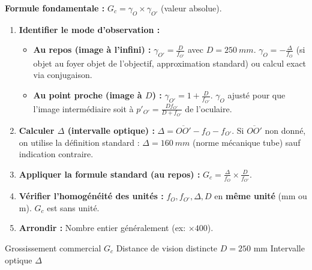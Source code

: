 \documentclass[11pt]{article}
\newcommand{\cle}[1]{{\popxbold\color{popdark}#1}}
\begin{document}
\begin{methode}
\textbf{Formule fondamentale :} $G_c = \gamma_O \times \gamma_{O'}$ (valeur absolue).
\begin{enumerate}
    \item \textbf{Identifier le mode d'observation :}
    \begin{itemize}
        \item \textbf{Au repos (image à l'infini) :} $\gamma_{O'} = \frac{D}{f_{O'}}$ avec $D = \SI{250}{mm}$. $\gamma_O = -\frac{\Delta}{f_O}$ (si objet au foyer objet de l'objectif, approximation standard) ou calcul exact via conjugaison.
        \item \textbf{Au point proche (image à $D$) :} $\gamma_{O'} = 1 + \frac{D}{f_{O'}}$. $\gamma_O$ ajusté pour que l'image intermédiaire soit à $p'_{O'} = \frac{D f_{O'}}{D+f_{O'}}$ de l'oculaire.
    \end{itemize}
    \item \textbf{Calculer $\Delta$ (intervalle optique) :} $\Delta = \overline{OO'} - f_O - f_{O'}$. Si $\overline{OO'}$ non donné, on utilise la définition standard : $\Delta = \SI{160}{mm}$ (norme mécanique tube) sauf indication contraire.
    \item \textbf{Appliquer la formule standard (au repos) :} $G_c = \frac{\Delta}{f_O} \times \frac{D}{f_{O'}}$.
    \item \textbf{Vérifier l'homogénéité des unités :} $f_O, f_{O'}, \Delta, D$ en \textbf{même unité} (mm ou m). $G_c$ est sans unité.
    \item \textbf{Arrondir :} Nombre entier généralement (ex: $\times 400$).
\end{enumerate}
\cle{Grossissement commercial $G_c$} \cle{Distance de vision distincte $D=250$ mm} \cle{Intervalle optique $\Delta$}
\end{methode}
\end{document}

